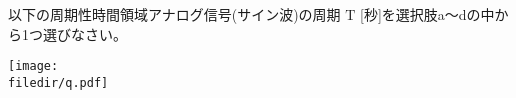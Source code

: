以下の周期性時間領域アナログ信号(サイン波)の周期 $\textrm{T}$ [秒]を選択肢a〜dの中から1つ選びなさい。

\centering\texttt{[image: \\filedir/q.pdf]}
